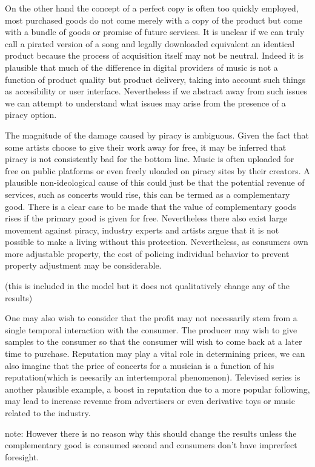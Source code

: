 \documentclass{article}
\begin{document}
On the other hand the concept of a perfect copy is often too quickly employed, most purchased goods do not come merely with a copy of the product but come with a bundle of goods or promise of future services. It is unclear if we can truly call a pirated version of a song and legally downloaded equivalent an identical product because the process of acquisition itself may not be neutral. Indeed it is plausible that much of the difference in digital providers of music is not a function of product quality but product delivery, taking into account such things as accesibility or user interface. Nevertheless if we abstract away from such issues we can attempt to understand what issues may arise from the presence of a piracy option. 

The magnitude of the damage caused by piracy is ambiguous. Given the fact that some artists choose to give their work away for free, it may be inferred that piracy is not consistently bad for the bottom line. Music is often uploaded for free on public platforms or even freely uloaded on piracy sites by their creators. A plausible non-ideological cause of this could just be that the potential revenue of services, such as concerts would rise, this can be termed as a complementary good. There is a clear case to be made that the value of complementary goods rises if the primary good is given for free.  Nevertheless there also exist large movement against piracy, industry experts and artists argue that it is not possible to make a living without this protection. Nevertheless, as consumers own more adjustable property, the cost of policing individual behavior to prevent property adjustment may be considerable. 

(this is included in the model but it does not qualitatively change any of the results)

One may also wish to consider that the profit may not necessarily stem from a single temporal interaction with the consumer. The producer may wish to give samples to the consumer so that the consumer will wish to come back at a later time to purchase. Reputation may play a vital role in determining prices, we can also imagine that the price of concerts for a musician is a function of his reputation(which is neesarily an intertemporal phenomenon). Televised series is another plausible example, a boost in reputation due to a more popular following, may lead to increase revenue from advertisers or even derivative toys or music related to the industry. 

note: However there is no reason why this should change the results unless the complementary good is consumed second and consumers don't have imprerfect foresight. 
\end{document}
